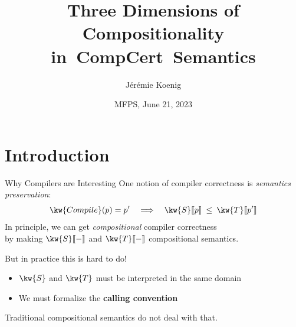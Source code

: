 \documentclass[aspectratio=1610,12pt]{beamer}
\title{Three Dimensions of Compositionality
  in~CompCert~Semantics}
\author{Jérémie Koenig}
\institute{Yale University}
\date{MFPS, June 21, 2023}
\begin{document}
\maketitle

\section*{Introduction}

\begin{frame}{Why Compilers are Interesting} %
One notion of compiler correctness is \emph{semantics preservation}:
\[
  \kw{Compile}(p) = p' \quad\Longrightarrow\quad
  \kw{S}\llbracket p \rrbracket \:\le\: \kw{T}\llbracket p' \rrbracket
\]
\pause
In principle,
we can get \emph{compositional} compiler correctness \\
by making $\kw{S}\llbracket - \rrbracket$ and $\kw{T}\llbracket - \rrbracket$
compositional semantics.

\vfill
\pause
But in practice this is hard to do!
\begin{itemize}
\item
$\kw{S}$ and $\kw{T}$
must be interpreted in the same domain
\item
We must formalize the \textbf{calling convention}
\end{itemize}
Traditional compositional semantics
do not deal with that.
\end{frame}
\end{document}
